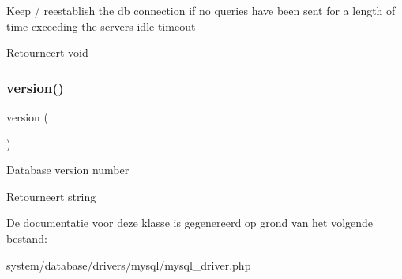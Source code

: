 Keep / reestablish the db connection if no queries have been sent for a length of time exceeding the server\textquotesingle{}s idle timeout

\begin{DoxyReturn}{Retourneert}
void 
\end{DoxyReturn}
\mbox{\label{class_c_i___d_b__mysql__driver_a6080dae0886626b9a4cedb29240708b1}} 
\subsubsection{\texorpdfstring{version()}{version()}}
{\footnotesize\ttfamily version (\begin{DoxyParamCaption}{ }\end{DoxyParamCaption})}

Database version number

\begin{DoxyReturn}{Retourneert}
string 
\end{DoxyReturn}


De documentatie voor deze klasse is gegenereerd op grond van het volgende bestand\+:\begin{DoxyCompactItemize}
\item 
system/database/drivers/mysql/mysql\+\_\+driver.\+php\end{DoxyCompactItemize}
